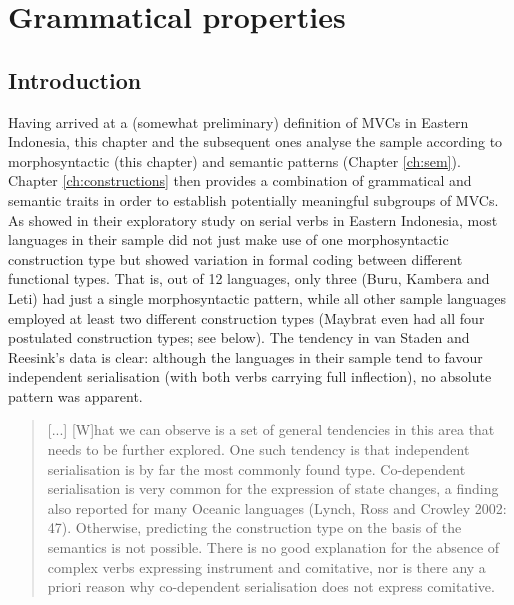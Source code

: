 \chapter{Grammatical properties}\label{ch:gram}
\section{Introduction}

Having arrived at a (somewhat preliminary) definition of MVCs in Eastern Indonesia, this chapter and the subsequent ones analyse the sample according to morphosyntactic (this chapter) and semantic patterns (Chapter \ref{ch:sem}). Chapter \ref{ch:constructions} then provides a combination of grammatical and semantic traits in order to establish potentially meaningful subgroups of MVCs. As \citet{vanstaden2008serial} showed in their exploratory study on serial verbs in Eastern Indonesia, most languages in their sample did not just make use of one morphosyntactic construction type but showed variation in formal coding between different functional types. That is, out of 12 languages, only three (Buru, Kambera and Leti) had just a single morphosyntactic pattern, while all other sample languages employed at least two different construction types (Maybrat even had all four postulated construction types; see  below). The tendency in van Staden and Reesink's data is clear: although the languages in their sample tend to favour independent serialisation (with both verbs carrying full inflection), no absolute pattern was apparent.

\begin{quote}
[...] [W]hat we can observe is a set of general tendencies in this area that needs to be further explored. One such tendency is that independent serialisation is by far the most commonly found type. Co-dependent serialisation is very common for the expression of state changes, a finding also reported for many Oceanic languages (Lynch, Ross and Crowley 2002: 47). Otherwise, predicting the construction type on the basis of the semantics is not possible. There is no good explanation for the absence of complex verbs expressing instrument and comitative, nor is there any a priori reason why co-dependent serialisation does not express comitative. \citep[48]{vanstaden2008serial}\end{quote}\nocite{LynchEtAl2002}

